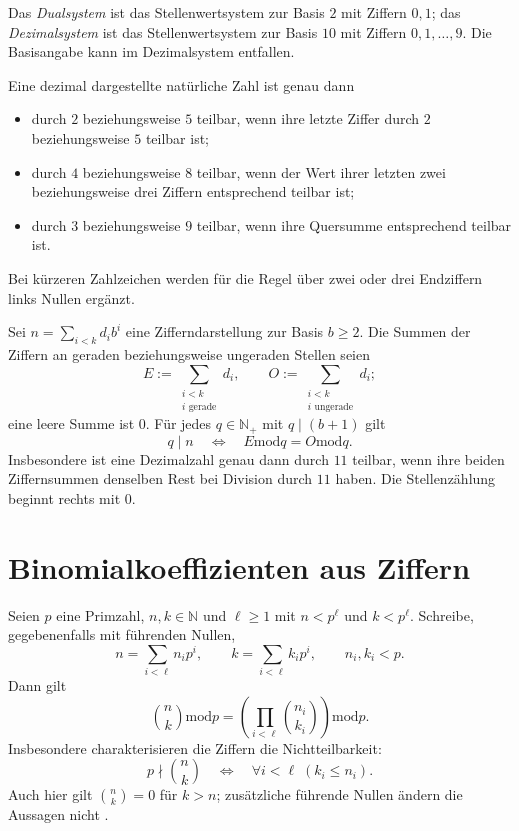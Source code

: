 \begin{definition}
Das \emph{Dualsystem} ist das Stellenwertsystem zur Basis $2$ mit
Ziffern $0,1$; das \emph{Dezimalsystem} ist das Stellenwertsystem
zur Basis $10$ mit Ziffern $0,1,\ldots,9$.
Die Basisangabe kann im Dezimalsystem entfallen.
\end{definition}

\begin{theorem}
Eine dezimal dargestellte natürliche Zahl ist genau dann
\begin{itemize}
 \item durch $2$ beziehungsweise $5$ teilbar, wenn ihre letzte
       Ziffer durch $2$ beziehungsweise $5$ teilbar ist;
 \item durch $4$ beziehungsweise $8$ teilbar, wenn der Wert ihrer
       letzten zwei beziehungsweise drei Ziffern entsprechend teilbar ist;
 \item durch $3$ beziehungsweise $9$ teilbar, wenn ihre Quersumme
       entsprechend teilbar ist.
\end{itemize}
Bei kürzeren Zahlzeichen werden für die Regel über zwei oder drei
Endziffern links Nullen ergänzt.
\end{theorem}

\begin{theorem}
\label{b10guide:thm:alternating-digit-sums}
Sei $n=\sum_{i<k}d_i b^i$ eine Zifferndarstellung zur Basis $b\ge2$.
Die Summen der Ziffern an geraden beziehungsweise ungeraden Stellen seien
\[
 E:=\sum_{\substack{i<k\\i\text{ gerade}}}d_i,
 \qquad O:=\sum_{\substack{i<k\\i\text{ ungerade}}}d_i;
\]
eine leere Summe ist $0$. Für jedes $q\in\mathbb N_+$ mit $q\mid(b+1)$ gilt
\[
 q\mid n\quad\Longleftrightarrow\quad
 E\mathbin{\mathrm{mod}}q=O\mathbin{\mathrm{mod}}q.
\]
Insbesondere ist eine Dezimalzahl genau dann durch $11$ teilbar,
wenn ihre beiden Ziffernsummen denselben Rest bei Division durch $11$ haben.
Die Stellenzählung beginnt rechts mit $0$.
\end{theorem}

\section{Binomialkoeffizienten aus Ziffern}

\begin{theorem}
\label{b10guide:thm:lucas}
Seien $p$ eine Primzahl, $n,k\in\mathbb N$ und $\ell\ge1$ mit
$n<p^\ell$ und $k<p^\ell$. Schreibe, gegebenenfalls mit führenden Nullen,
\[
 n=\sum_{i<\ell}n_i p^i,\qquad
 k=\sum_{i<\ell}k_i p^i,\qquad n_i,k_i<p.
\]
Dann gilt
\[
 \binom{n}{k}\mathbin{\mathrm{mod}}p
 =\left(\prod_{i<\ell}\binom{n_i}{k_i}\right)
       \mathbin{\mathrm{mod}}p.
\]
Insbesondere charakterisieren die Ziffern die Nichtteilbarkeit:
\[
 p\nmid\binom{n}{k}\quad\Longleftrightarrow\quad
       \forall i<\ell\;(k_i\le n_i).
\]
Auch hier gilt $\binom{n}{k}=0$ für $k>n$; zusätzliche führende
Nullen ändern die Aussagen nicht \cite{natlucas}.
\end{theorem}


